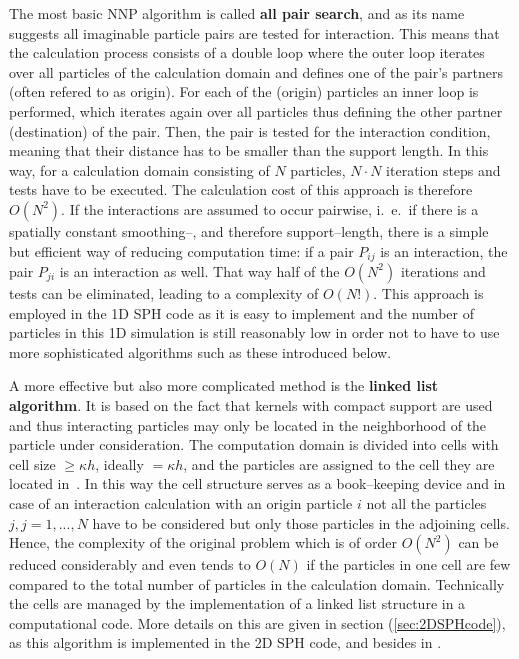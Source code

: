 \documentclass{report}
\begin{document}
The most basic NNP algorithm is called {\bf all pair search}, and as its name
suggests all imaginable particle pairs are tested for interaction. This means
that the calculation process consists of a double loop where the outer loop
iterates over all particles of the calculation domain and defines one of the pair's partners (often
refered to as origin). For each of the (origin) particles an inner loop is
performed, which iterates again over all particles thus defining the other
partner (destination) of the pair. Then, the pair is tested for the
interaction condition, meaning that their distance has to be smaller than the
support length. In this way, for a calculation domain consisting of $N$
particles, $N\cdot N$ iteration steps and tests have to be executed. The
calculation cost of this approach is therefore $O(N^2)$. 
If the
interactions are assumed to occur pairwise, i.\ e.\ if there is a spatially constant
smoothing--, and therefore support--length,
there is a simple but efficient way of reducing computation
time: if a pair $P_{ij}$ is an interaction, the pair
$P_{ji}$ is an interaction as well. That way half of the $O(N^2)$ iterations
and tests can be eliminated, leading to a complexity of $O(N!)$. 
This approach is employed in the 1D SPH code as it is easy to
implement \cite{Liu2003} and the number of particles in this 1D simulation is
still reasonably low in order not to have to use more sophisticated algorithms
such as these introduced below.


A more effective but also more complicated method is the {\bf linked list
algorithm}. It is based on the fact that kernels with compact support are
used and thus interacting particles may only be located in the neighborhood of
the particle under consideration. The computation domain is divided into cells with
cell size $\ge \kappa h$, ideally $=\kappa h$, and the
particles are assigned to the cell they are located in~\cite{Monaghan1983}. In this way the cell
structure serves as a book--keeping device and in case of an interaction
calculation with an origin particle $i$ not all the particles $j,j={1,...,N}$ have
to be considered but only those particles in the adjoining cells. Hence, the
complexity of the original problem which is of order $O(N^2)$ can be reduced
considerably and even tends to $O(N)$ if the particles in one cell are few compared to the total number of particles in the calculation domain. 
Technically the cells are managed by the implementation of a linked list
structure in a computational code. More details on this are given in section
(\ref{sec:2DSPHcode}), as this algorithm is implemented in the 2D
SPH code, and besides in \cite{Monaghan1985, Hockney1988}.
\end{document}
